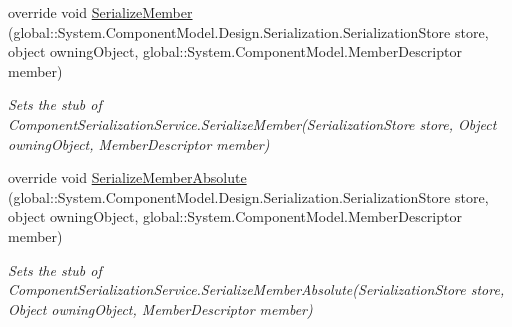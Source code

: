 \begin{DoxyCompactItemize}
override void \hyperlink{class_system_1_1_component_model_1_1_design_1_1_serialization_1_1_fakes_1_1_stub_component_serialization_service_a614fcafdf4595227fa29793e901ad02e}{Serialize\-Member} (global\-::\-System.\-Component\-Model.\-Design.\-Serialization.\-Serialization\-Store store, object owning\-Object, global\-::\-System.\-Component\-Model.\-Member\-Descriptor member)
\begin{DoxyCompactList}\small\item\em Sets the stub of Component\-Serialization\-Service.\-Serialize\-Member(\-Serialization\-Store store, Object owning\-Object, Member\-Descriptor member)\end{DoxyCompactList}\item 
override void \hyperlink{class_system_1_1_component_model_1_1_design_1_1_serialization_1_1_fakes_1_1_stub_component_serialization_service_a561bcb48fba807101319904dc3282ba0}{Serialize\-Member\-Absolute} (global\-::\-System.\-Component\-Model.\-Design.\-Serialization.\-Serialization\-Store store, object owning\-Object, global\-::\-System.\-Component\-Model.\-Member\-Descriptor member)
\begin{DoxyCompactList}\small\item\em Sets the stub of Component\-Serialization\-Service.\-Serialize\-Member\-Absolute(\-Serialization\-Store store, Object owning\-Object, Member\-Descriptor member)\end{DoxyCompactList}\end{DoxyCompactItemize}
